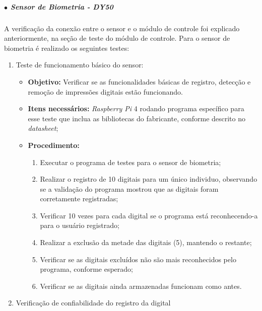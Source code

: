 \begin{enumerate}
\end{enumerate}

\subparagraph*{$\bullet$ Sensor de Biometria - DY50} \hfill

A verificação da conexão entre o sensor e o módulo de controle foi explicado anteriormente, na seção de teste do módulo de controle. Para o sensor de biometria é realizado os seguintes testes:

\begin{enumerate}
    \item Teste de funcionamento básico do sensor:
    
    \begin{itemize}
        \item \textbf{Objetivo:} Verificar se as funcionalidades básicas de registro, detecção e remoção de impressões digitais estão funcionando.
        \item \textbf{Itens necessários:} \textit{Raspberry Pi} 4 rodando programa específico para esse teste que inclua as bibliotecas do fabricante, conforme descrito no \textit{datasheet};
        \item \textbf{Procedimento:} 
        \begin{enumerate}
            \item Executar o programa de testes para o sensor de biometria;
            \item Realizar o registro de 10 digitais para um único individuo, observando se a validação do programa mostrou que as digitais foram corretamente registradas;
            \item Verificar 10 vezes para cada digital se o programa está reconhecendo-a para o usuário registrado;
            \item Realizar a exclusão da metade das digitais (5), mantendo o restante;
            \item Verificar se as digitais excluídos não são mais reconhecidos pelo programa, conforme esperado;
            \item Verificar se as digitais ainda armazenadas funcionam como antes.
        \end{enumerate}
    \end{itemize}

	\newpage %
    
    \item Verificação de confiabilidade do registro da digital
    

\end{enumerate}

